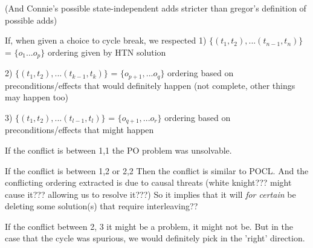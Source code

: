 (And Connie's possible state-independent adds stricter than gregor's definition of possible adds)

If, when given a choice to cycle break, we respected 
1) $\{(t_1, t_2), ... (t_{n-1}, t_n )\}$ = $\{o_1 ... o_p \}$ ordering given by HTN solution

2) $\{(t_1, t_2), ... (t_{k-1}, t_k )\}$ = $\{o_{p+1}, ... o_q\}$ ordering based on preconditions/effects that would definitely happen (not complete, other things may happen too)

3) $\{(t_1, t_2), ... (t_{l-1}, t_l )\}$ = $\{o_{q+1}, ... o_r\}$ ordering based on preconditions/effects that might happen

If the conflict is between 1,1 the PO problem was unsolvable.

If the conflict is between 1,2 or 2,2
Then the conflict is similar to POCL.
And the conflicting  ordering extracted is due to causal threats (white knight??? might cause it??? allowing us to resolve it???)
So it implies that it will \emph{for certain} be deleting some solution(s) that require interleaving??

If the conflict between 2, 3 it might be a problem, it might not be. But in the case that the cycle was spurious, we would definitely pick in the 'right' direction.



